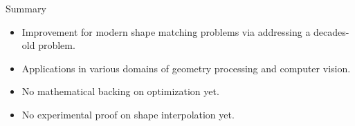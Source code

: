 \documentclass{beamer}
\begin{document}
\begin{frame}{Summary}
    \begin{itemize}
        \item Improvement for modern shape matching problems via addressing a decades-old problem. 
        \item Applications in various domains of geometry processing and computer vision.
        \item No mathematical backing on optimization yet.
        \item No experimental proof on shape interpolation yet.
    \end{itemize}
\end{frame}


















\end{document}
